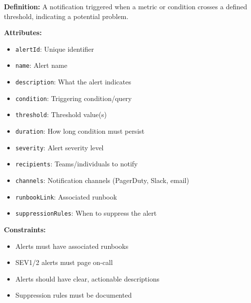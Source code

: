 \documentclass[11pt,letterpaper]{article}
\begin{document}
\begin{definitionbox}
\textbf{Definition:} A notification triggered when a metric or condition crosses a defined threshold, indicating a potential problem.

\textbf{Attributes:}
\begin{itemize}[nosep]
    \item \texttt{alertId}: Unique identifier
    \item \texttt{name}: Alert name
    \item \texttt{description}: What the alert indicates
    \item \texttt{condition}: Triggering condition/query
    \item \texttt{threshold}: Threshold value(s)
    \item \texttt{duration}: How long condition must persist
    \item \texttt{severity}: Alert severity level
    \item \texttt{recipients}: Teams/individuals to notify
    \item \texttt{channels}: Notification channels (PagerDuty, Slack, email)
    \item \texttt{runbookLink}: Associated runbook
    \item \texttt{suppressionRules}: When to suppress the alert
\end{itemize}

\textbf{Constraints:}
\begin{itemize}[nosep]
    \item Alerts must have associated runbooks
    \item SEV1/2 alerts must page on-call
    \item Alerts should have clear, actionable descriptions
    \item Suppression rules must be documented
\end{itemize}
\end{definitionbox}
\end{document}
